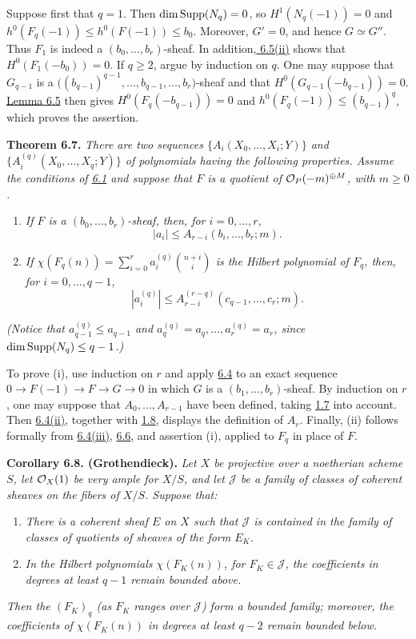 Suppose first that $q=1$. Then $\dim\operatorname{Supp}(N_q)=0$, so
$H^1(N_q(-1))=0$ and $h^0(F_q(-1))\leq h^0(F(-1))\leq b_0$.
Moreover, $G'=0$, and hence $G\simeq G''$. Thus $F_1$ is indeed a $(b_0,\ldots,b_r)$-sheaf. In addition,\hyperlink{sga6.e13.lem.6-5}{ 6.5(ii)} shows that
$H^0(F_1(-b_0))=0$. If $q\geq2$, argue by induction on $q$. One may
suppose that $G_{q-1}$ is a
$\bigl((b_{q-1})^{q-1},\ldots,b_{q-1},\ldots,b_r\bigr)$-sheaf and that
$H^0(G_{q-1}(-b_{q-1}))=0$. \hyperlink{sga6.e13.lem.6-5}{Lemma 6.5} then gives
$H^0(F_q(-b_{q-1}))=0$ and $h^0(F_q(-1))\leq(b_{q-1})^q$,
which proves the assertion.

\textbf{Theorem 6.7.} \emph{There are two sequences
$\{A_i(X_0,\ldots,X_i;Y)\}$ and
$\{A_i^{(q)}(X_0,\ldots,X_q;Y)\}$ of polynomials having the following
properties. Assume the conditions of \hyperlink{sga6.e13.para.6-1}{6.1} and suppose that $F$ is a
quotient of $\mathcal O_P(-m)^{\oplus M}$, with $m\geq0$.}
\begin{enumerate}[label=(\roman*)]
\item \emph{If $F$ is a $(b_0,\ldots,b_r)$-sheaf, then, for
$i=0,\ldots,r$,}
\[
  |a_i|\leq A_{r-i}(b_i,\ldots,b_r;m).
\]
\item \emph{If
$\chi(F_q(n))=\sum_{i=0}^{r}a_i^{(q)}\binom{n+i}{i}$ is the Hilbert
polynomial of $F_q$, then, for $i=0,\ldots,q-1$,}
\[
  |a_i^{(q)}|\leq A_{r-i}^{(r-q)}(c_{q-1},\ldots,c_r;m).
\]
\end{enumerate}
\emph{(Notice that $a_{q-1}^{(q)}\leq a_{q-1}$ and
$a_q^{(q)}=a_q,\ldots,a_r^{(q)}=a_r$, since
$\dim\operatorname{Supp}(N_q)\leq q-1$.)}

To prove (i), use induction on $r$ and apply \hyperlink{sga6.e13.thm.6-4}{6.4} to an exact sequence
$0\longrightarrow F(-1)\longrightarrow F\longrightarrow G\longrightarrow0$
in which $G$ is a $(b_1,\ldots,b_r)$-sheaf. By induction on $r$, one may
suppose that $A_0,\ldots,A_{r-1}$ have been defined, taking \hyperlink{sga6.e13.lem.1-7}{1.7} into
account. Then \hyperlink{sga6.e13.thm.6-4}{6.4(ii)}, together with \hyperlink{sga6.e13.prop.1-8}{1.8}, displays the definition of
$A_r$. Finally, (ii) follows formally from \hyperlink{sga6.e13.thm.6-4}{6.4(iii)}, \hyperlink{sga6.e13.prop.6-6}{6.6}, and assertion
(i), applied to $F_q$ in place of $F$.

\textbf{Corollary 6.8. (Grothendieck).} \emph{Let $X$ be projective over
a noetherian scheme $S$, let $\mathcal O_X(1)$ be very ample for $X/S$, and let
$\mathcal J$ be a family of classes of coherent sheaves on the fibers of
$X/S$. Suppose that:}
\begin{enumerate}[label=(\alph*)]
\item \emph{There is a coherent sheaf $E$ on $X$ such that $\mathcal J$
is contained in the family of classes of quotients of sheaves of the
form $E_K$.}
\item[$(b_q)$] \emph{In the Hilbert polynomials $\chi(F_K(n))$, for
$F_K\in\mathcal J$, the coefficients in degrees at least $q-1$ remain
bounded above.}
\end{enumerate}
\emph{Then the $(F_K)_q$ (as $F_K$ ranges over $\mathcal J$) form a
bounded family; moreover, the coefficients of $\chi(F_K(n))$ in degrees
at least $q-2$ remain bounded below.}

